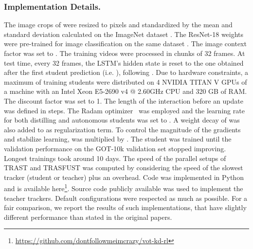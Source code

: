 \documentclass[runningheads]{llncs}
\makeatletter
\def\myalgonamesecond{TRAST\@\xspace}
\def\myalgonamethird{TRASFUST\@\xspace}
\makeatother
\begin{document}
\subsubsection{Implementation Details.}
The image crops of  were resized to  pixels and standardized by the mean and standard deviation calculated on the ImageNet dataset \cite{ImageNet}. The ResNet-18 weights were pre-trained for image classification on the same dataset \cite{ImageNet}. The image context factor  was set to . The training videos were processed in chunks of 32 frames. At test time, every 32 frames, the LSTM's hidden state is reset to the one obtained after the first student prediction (i.e. ), following \cite{RE3}.
Due to hardware constraints, a maximum of  training students were distributed on 4 NVIDIA TITAN V GPUs of a machine with an Intel Xeon E5-2690 v4 @ 2.60GHz CPU and 320 GB of RAM. 
The discount factor  was set to 1. The length of the interaction before an update was defined in  steps. 
The Radam optimizer~\cite{Radam} was employed and the learning rate for both distilling and autonomous students was set to . A weight decay of  was also added to  as regularization term. To control the magnitude of the gradients and stabilize learning,  was multiplied by .
The student was trained until the validation performance on the GOT-10k validation set stopped improving. Longest trainings took around 10 days.
The speed of the parallel setups of \myalgonamesecond and \myalgonamethird was computed by considering the speed of the slowest tracker (student or teacher) plus an overhead.
Code was implemented in Python and is available here\footnote{\url{https://github.com/dontfollowmeimcrazy/vot-kd-rl}}.
Source code publicly available was used to implement the teacher trackers. Default configurations were respected as much as possible. For a fair comparison, we report the results of such implementations, that have slightly different performance than stated in the original papers. 
\end{document}
